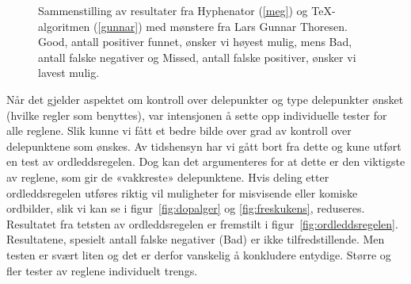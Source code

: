 \begin{figure}[h]
	
  \caption{Sammenstilling av resultater fra Hyphenator (\ref{meg}) og \TeX{}-algoritmen (\ref{gunnar}) med mønstere fra Lars Gunnar Thoresen. Good, antall positiver funnet, ønsker vi høyest mulig, mens Bad, antall falske negativer og Missed, antall falske positiver, ønsker vi lavest mulig.}
  \label{fig:results}
\end{figure}

Når det gjelder aspektet om kontroll over delepunkter og type delepunkter ønsket (hvilke regler som benyttes), var intensjonen å sette opp individuelle tester for alle reglene. Slik kunne vi fått et bedre bilde over grad av kontroll over delepunktene som ønskes. Av tidshensyn har vi gått bort fra dette og kune utført en test av ordleddsregelen. Dog kan det argumenteres for at dette er den viktigste av reglene, som gir de «vakkreste» delepunktene. Hvis deling etter ordleddsregelen utføres riktig vil muligheter for misvisende eller komiske ordbilder, slik vi kan se i figur~\ref{fig:dopalger} og \ref{fig:freskukens}, reduseres. Resultatet fra tetsten av ordleddsregelen er fremstilt i figur~\ref{fig:ordleddsregelen}. Resultatene, spesielt antall falske negativer (Bad) er ikke tilfredstillende. Men testen er svært liten og det er derfor vanskelig å konkludere entydige. Større og fler tester av reglene individuelt trengs.


